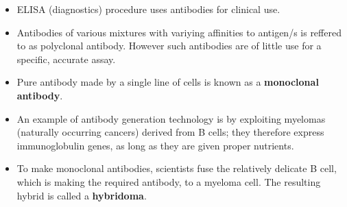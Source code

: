 \documentclass[11pt,dvipsnames,ignorenonframetext,aspectratio=169]{beamer}
\providecommand{\tightlist}{%
  \setlength{\itemsep}{0pt}\setlength{\parskip}{0pt}}
\begin{document}
\begin{frame}{}
\protect\hypertarget{section-14}{}

\begin{itemize}
\tightlist
\item
  ELISA (diagnostics) procedure uses antibodies for clinical use.
\item
  Antibodies of various mixtures with variying affinities to antigen/s
  is reffered to as polyclonal antibody. However such antibodies are of
  little use for a specific, accurate assay.
\item
  Pure antibody made by a single line of cells is known as a
  \textbf{monoclonal antibody}.
\item
  An example of antibody generation technology is by exploiting myelomas
  (naturally occurring cancers) derived from B cells; they therefore
  express immunoglobulin genes, as long as they are given proper
  nutrients.
\item
  To make monoclonal antibodies, scientists fuse the relatively delicate
  B cell, which is making the required antibody, to a myeloma cell. The
  resulting hybrid is called a \textbf{hybridoma}.
\end{itemize}

\end{frame}
\end{document}
